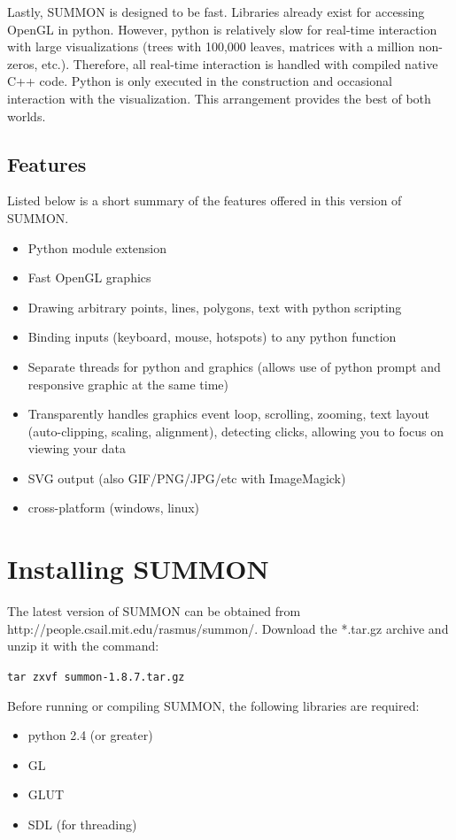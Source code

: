\documentclass[12pt]{article}
\newcommand{\items}[1]{\begin{itemize} #1 \end{itemize}}
\newcommand{\codeblock}[1]{\vspace{.1in} {\tt #1} \vspace{.1in}}
\newcommand{\version}{1.8.7}
\begin{document}
Lastly, SUMMON is designed to be fast.  Libraries already exist for
accessing OpenGL in python.  However, python is relatively slow for real-time
interaction with large visualizations (trees with 100,000 leaves, matrices with
a million non-zeros, etc.).  Therefore, all real-time interaction is handled
with compiled native C++ code.  Python is only executed in the construction 
and occasional interaction with the visualization.  This arrangement provides 
the best of both worlds.




\subsection{Features}

Listed below is a short summary of the features offered in this version of
SUMMON.

\items{
    \item Python module extension
    \item Fast OpenGL graphics
    \item Drawing arbitrary points, lines, polygons, text with python scripting
    \item Binding inputs (keyboard, mouse, hotspots) to any python function 
    \item Separate threads for python and graphics (allows use of python prompt
          and responsive graphic at the same time)    
    \item Transparently handles graphics event loop, scrolling, zooming, text
          layout (auto-clipping, scaling, alignment), detecting clicks, allowing
          you to focus on viewing your data
    \item SVG output (also GIF/PNG/JPG/etc with ImageMagick)
    \item cross-platform (windows, linux)
}


\section{Installing SUMMON}
\label{sec:installing}

The latest version of SUMMON can be obtained from 
http://people.csail.mit.edu/rasmus/summon/.  Download the *.tar.gz archive and
unzip it with the command:

\codeblock{tar zxvf summon-\version.tar.gz}

Before running or compiling SUMMON, the following libraries are required:
\items {
    \item python 2.4 (or greater)
    \item GL   
    \item GLUT
    \item SDL (for threading)
}
\end{document}
